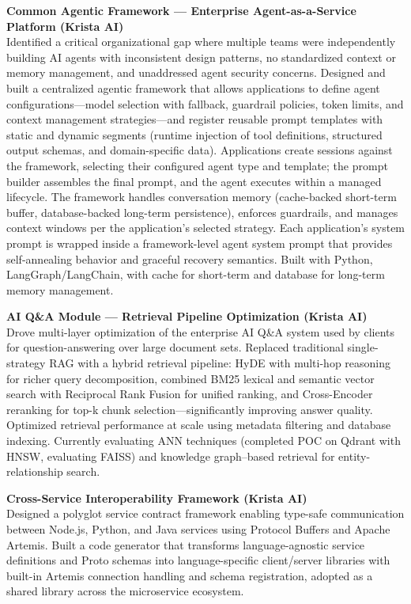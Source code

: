 \documentclass[a4paper,11pt]{article}
\begin{document}
\vspace{6pt}
\textbf{Common Agentic Framework --- Enterprise Agent-as-a-Service Platform (Krista AI)} \\
Identified a critical organizational gap where multiple teams were independently building AI agents with inconsistent design patterns, no standardized context or memory management, and unaddressed agent security concerns. Designed and built a centralized agentic framework that allows applications to define agent configurations---model selection with fallback, guardrail policies, token limits, and context management strategies---and register reusable prompt templates with static and dynamic segments (runtime injection of tool definitions, structured output schemas, and domain-specific data). Applications create sessions against the framework, selecting their configured agent type and template; the prompt builder assembles the final prompt, and the agent executes within a managed lifecycle. The framework handles conversation memory (cache-backed short-term buffer, database-backed long-term persistence), enforces guardrails, and manages context windows per the application's selected strategy. Each application's system prompt is wrapped inside a framework-level agent system prompt that provides self-annealing behavior and graceful recovery semantics. Built with Python, LangGraph/LangChain, with cache for short-term and database for long-term memory management.

\vspace{6pt}
\textbf{AI Q\&A Module --- Retrieval Pipeline Optimization (Krista AI)} \\
Drove multi-layer optimization of the enterprise AI Q\&A system used by clients for question-answering over large document sets. Replaced traditional single-strategy RAG with a hybrid retrieval pipeline: HyDE with multi-hop reasoning for richer query decomposition, combined BM25 lexical and semantic vector search with Reciprocal Rank Fusion for unified ranking, and Cross-Encoder reranking for top-k chunk selection---significantly improving answer quality. Optimized retrieval performance at scale using metadata filtering and database indexing. Currently evaluating ANN techniques (completed POC on Qdrant with HNSW, evaluating FAISS) and knowledge graph--based retrieval for entity-relationship search.

\vspace{6pt}
\textbf{Cross-Service Interoperability Framework (Krista AI)} \\
Designed a polyglot service contract framework enabling type-safe communication between Node.js, Python, and Java services using Protocol Buffers and Apache Artemis. Built a code generator that transforms language-agnostic service definitions and Proto schemas into language-specific client/server libraries with built-in Artemis connection handling and schema registration, adopted as a shared library across the microservice ecosystem.
\end{document}

